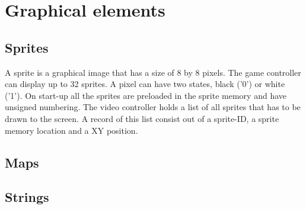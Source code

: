 \section {Graphical elements}

\subsection{Sprites}
\par \noindent A sprite is a graphical image that has a size of 8 by 8 pixels. The game controller can display up to 32 sprites. A pixel can have
 two states, black ('0') or white ('1'). On start-up all the sprites are preloaded in the sprite memory and have unsigned numbering. The video 
 controller holds a list of all sprites that has to be drawn to the screen. A record of this list consist out of a sprite-ID, a sprite memory
 location and a XY position.
 
\subsection{Maps}
\subsection{Strings}